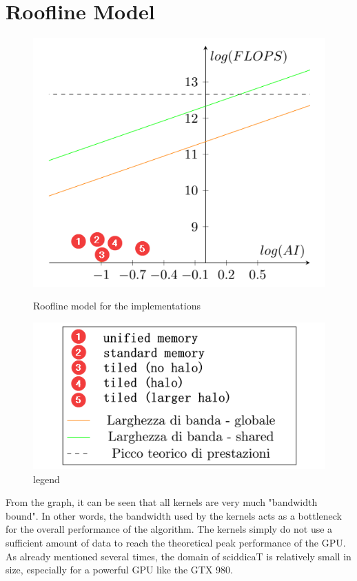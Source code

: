 \documentclass{article}
\begin{document}
\section{Roofline Model}
\begin{figure}[H]
	\begin{minipage}[t]{0.55\textwidth}
		\centering
		\includegraphics[width=\textwidth]{./pics/roofline.png}
		\caption{Roofline model for the implementations}
		\label{fig:roofline}
	\end{minipage}\hfill
	\begin{minipage}[t]{0.35\textwidth}
		\centering
		\includegraphics[width=\textwidth]{./pics/legend.png}
		\caption{legend}
		\label{fig:legend}
	\end{minipage}
\end{figure}

From the graph, it can be seen that all kernels are very much "bandwidth bound". In other words, the bandwidth used by the kernels acts as a bottleneck for the overall performance of the algorithm. The kernels simply do not use a sufficient amount of data to reach the theoretical peak performance of the GPU. As already mentioned several times, the domain of sciddicaT is relatively small in size, especially for a powerful GPU like the GTX 980.
\end{document}
